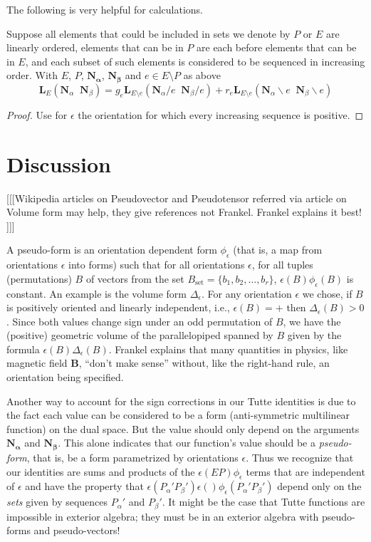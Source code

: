 \documentclass[Unicode]{cedram-alco}
\newcommand{\ext}[1]{\ensuremath{\mathbf{#1}}}
\newcommand{\eNal}{\ensuremath{\ext{N}_{\alpha}}}
\newcommand{\eNbe}{\ensuremath{\ext{N}_\beta}}
\newcommand{\extLHorSub}[3]{\ext{L}_{#1}\left(  {#2}\;\; {#3}  \right)}
\begin{document}
The following is very helpful for calculations.

\begin{coro}
  Suppose all elements that could be included in sets we denote by $P$ or $E$ are linearly ordered,
  elements that can be in $P$ are each before elements that can be in $E$,
  and each subset of such elements is considered to be sequenced in increasing order.  With
  $E$, $P$, $\ext{N_\alpha}$, $\ext{N_\beta}$ and $e\in E\setminus P$ as above
  \begin{equation}
       \extLHorSub{E}{\eNal}{\eNbe}=
      g_e\extLHorSub{E\setminus e}{\eNal/e}{\eNbe/e} +
      r_e\extLHorSub{E\setminus e}{\eNal\backslash e}{\eNbe\backslash e}
  \end{equation}
\end{coro}
\begin{proof}
  Use for $\epsilon$ the orientation for which every increasing sequence is positive.
\end{proof}


\section{Discussion}
[[[Wikipedia articles on Pseudovector and Pseudotensor
      referred via article on Volume form may help, they give references not  Frankel.
      Frankel explains it best! ]]]

A pseudo-form\cite[p 85-87]{Frankel} is an orientation dependent form $\phi_\epsilon$ (that is, a
map from orientations $\epsilon$ into forms) such that
for all orientations $\epsilon$, for all tuples (permutations) $B$ of vectors from the
set $B_{\text{set}}=\{b_1, b_2, \ldots, b_r\}$, $\epsilon(B)\phi_\epsilon(B)$
is constant. An example is the volume form $\Delta_\epsilon$.
For any orientation $\epsilon$ we chose,
if $B$ is positively oriented and linearly independent, i.e., $\epsilon(B)=+$
then $\Delta_\epsilon(B)>0$.  Since both values change sign under an odd permutation
of $B$, we have the (positive) geometric volume of the
parallelopiped spanned by $B$ given by the formula $\epsilon(B)\Delta_\epsilon(B)$.
Frankel explains that many quantities in physics, like magnetic field $\ext{B}$,
``don't make sense'' without, like the right-hand rule,
an orientation being specified.


Another way to account for the sign corrections in our Tutte identities
is due to the fact each value can be considered to be a form (anti-symmetric
multilinear function) on the dual space. But the value should only depend
on the arguments $\ext{N_\alpha}$ and $\ext{N_\beta}$. This alone indicates
that our function's value should be a \emph{pseudo-form}, that is,
be a form parametrized by orientations $\epsilon$.  Thus we recognize that
our identities are sums and products of the $\epsilon(EP)\phi_\epsilon$ terms
that are independent of $\epsilon$ and have the property that
$\epsilon(P_\alpha'P_\beta')\epsilon()\phi_\epsilon(P_\alpha'P_\beta')$
depend only on the \emph{sets} given by sequences $P_\alpha'$ and $P_\beta'$.
It might be the case that Tutte functions are impossible in
exterior algebra; they must be in an exterior algebra with pseudo-forms
and pseudo-vectors!
\end{document}
